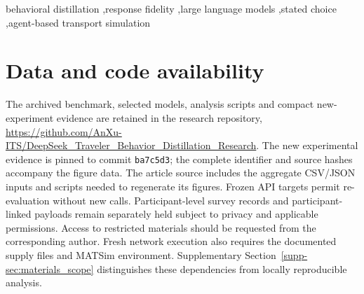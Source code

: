 \documentclass[a4paper,fleqn]{cas-sc}
\begin{document}
\begin{keywords}
behavioral distillation \sep response fidelity \sep large language models \sep stated choice \sep agent-based transport simulation
\end{keywords}
\maketitle







\section*{Data and code availability}
The archived benchmark, selected models, analysis scripts and compact new-experiment evidence are retained in the research repository, \url{https://github.com/AnXu-ITS/DeepSeek_Traveler_Behavior_Distillation_Research}. The new experimental evidence is pinned to commit \texttt{ba7c5d3}; the complete identifier and source hashes accompany the figure data. The article source includes the aggregate CSV/JSON inputs and scripts needed to regenerate its figures. Frozen API targets permit re-evaluation without new calls. Participant-level survey records and participant-linked payloads remain separately held subject to privacy and applicable permissions. Access to restricted materials should be requested from the corresponding author. Fresh network execution also requires the documented supply files and MATSim environment. Supplementary Section~\ref{supp-sec:materials_scope} distinguishes these dependencies from locally reproducible analysis.
\FloatBarrier
\appendix




\FloatBarrier
\clearpage
\setlength{\bibsep}{0pt}


\end{document}
